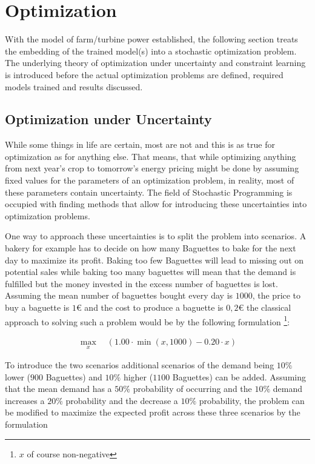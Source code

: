 \chapter{Optimization}\label{section:optimization}

With the model of farm/turbine power established, the following section treats the embedding of the trained model(s)  into a stochastic optimization problem. The underlying theory of optimization under uncertainty and constraint learning is introduced before the actual optimization problems are defined, required models trained and results discussed.

\section{Optimization under Uncertainty}

While some things in life are certain, most are not and this is as true for optimization as for anything else. That means, that while optimizing anything from next year's crop to tomorrow's energy pricing might be done by assuming fixed values for the parameters of an optimization problem, in reality, most of these parameters contain uncertainty. The field of Stochastic Programming is occupied with finding methods that allow for introducing these uncertainties into optimization problems.

One way to approach these uncertainties is to split the problem into scenarios. A bakery for example has to decide on how many Baguettes to bake for the next day to maximize its profit. Baking too few Baguettes will lead to missing out on potential sales while baking too many baguettes will mean that the demand is fulfilled but the money invested in the excess number of baguettes is lost. Assuming the mean number of baguettes bought every day is $1000$, the price to buy a baguette is $1 €$ and the cost to produce a baguette is $0,2 €$ the classical approach to solving such a problem would be by the following formulation \footnote{$x$ of course non-negative}: 


\begin{align*}
	\max_{x} \quad \left( 1.00 \cdot \min(x,1000) - 0.20 \cdot x \right)
\end{align*}


To introduce the two scenarios additional scenarios of the demand being $10\%$ lower ($900$ Baguettes) and $10\%$ higher ($1100$ Baguettes) can be added. Assuming that the mean demand has a $50\%$ probability of occurring and the $10\%$ demand increases a $20\%$ probability and the decrease a $10\%$  probability, the problem can be modified to maximize the expected profit across these three scenarios by the formulation

